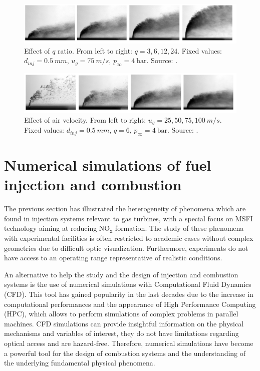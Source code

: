 \begin{figure}[h!]
	\centering
	\includegraphics[scale=0.45]{./part0_intro/parametric_JICF_q_ratio}
	\caption{Effect of $q$ ratio. From left to right: $q = 3, 6, 12, 24$. Fixed values: $d_{inj} = 0.5 ~mm$, $u_g = 75 ~m/s$, $p_\infty = 4 ~\mathrm{bar}$. Source: .}
	\label{fig:parametric_JICF_q_ratio}
\end{figure}

\begin{figure}[h!]
	\centering
	\includegraphics[scale=0.45]{./part0_intro/parametric_JICF_air_velocity}
	\caption{Effect of air velocity. From left to right: $u_g = 25, 50, 75, 100 ~m/s$. Fixed values: $d_{inj} = 0.5 ~mm$, $q = 6$, $p_\infty = 4 ~\mathrm{bar}$. Source: .}
	\label{fig:parametric_JICF_air_velocity}
\end{figure}


\section{Numerical simulations of fuel injection and combustion }

The previous section has illustrated the heterogeneity of phenomena which are found in injection systems relevant to gas turbines, with a special focus on MSFI technology aiming at reducing NO$_\mathrm{x}$ formation. The study of these phenomena with experimental facilities is often restricted to academic cases without complex geometries due to difficult optic visualization. Furthermore, experiments do not have access to an operating range representative of realistic conditions.

An alternative to help the study and the design of injection and combustion systems is the use of numerical simulations with Computational Fluid Dynamics (CFD). This tool has gained popularity in the last decades due to the increase in computational performances and the appearance of High Performance Computing (HPC), which allows to perform simulations of complex problems in parallel machines. CFD simulations can provide insightful information on the physical mechanisms and variables of interest, they do not have limitations regarding optical access and are hazard-free. Therefore, numerical simulations have become a powerful tool for the design of combustion systems and the understanding of the underlying fundamental physical phenomena.

